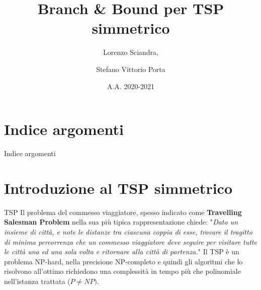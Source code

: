 \documentclass[10pt]{beamer}
\title{Branch \& Bound per TSP simmetrico}
\author{Lorenzo Sciandra, \and Stefano Vittorio Porta}
\date{A.A. 2020-2021}
\institute{Università degli Studi di Torino}
\begin{document}
\maketitle

\section{Indice argomenti}

\begin{frame}{Indice argomenti}
    \tableofcontents
\end{frame}

\section{Introduzione al TSP simmetrico}
\begin{frame}{TSP}
    Il problema del commesso viaggiatore, spesso indicato come \textbf{Travelling Salesman Problem} nella sua più tipica rappresentazione chiede:\newline
    "\textit{Dato un insieme di città, e note le distanze tra ciascuna coppia di esse, trovare il tragitto di minima percorrenza che un commesso viaggiatore deve seguire per visitare tutte le città una ed una sola volta e ritornare alla città di partenza.}"
    \newline
    \newline
    Il TSP è un problema NP-hard, nella precisione NP-completo e quindi gli algoritmi che lo risolvono all'ottimo richiedono una complessità in tempo più che polinomiale nell'istanza trattata ($P \neq NP)$.
\end{frame}
\end{document}

